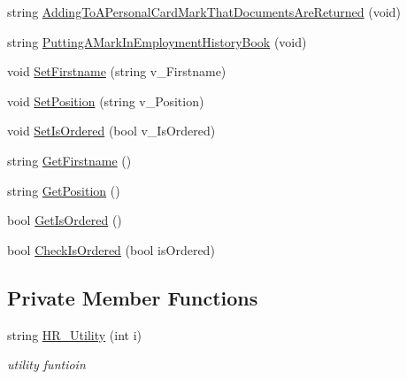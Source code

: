 \begin{DoxyCompactItemize}
string \hyperlink{class_h_r_a896d89581c96f0dcedca7440d2798d15}{Adding\+To\+A\+Personal\+Card\+Mark\+That\+Documents\+Are\+Returned} (void)
\item 
string \hyperlink{class_h_r_aacf64628213ae72aa5ff5a1b44e829fa}{Putting\+A\+Mark\+In\+Employment\+History\+Book} (void)
\item 
void \hyperlink{class_h_r_a795d089594c22910ea58938faf131b67}{Set\+Firstname} (string v\+\_\+\+Firstname)
\item 
void \hyperlink{class_h_r_ae092262d1dc245604fdb37fbe5564362}{Set\+Position} (string v\+\_\+\+Position)
\item 
void \hyperlink{class_h_r_ac927323d22c1580b0b6d258e28294322}{Set\+Is\+Ordered} (bool v\+\_\+\+Is\+Ordered)
\item 
string \hyperlink{class_h_r_a03a185de9601109b13c6a34c381b7b6f}{Get\+Firstname} ()
\item 
string \hyperlink{class_h_r_aed5b4581248646ba06467442b080c262}{Get\+Position} ()
\item 
bool \hyperlink{class_h_r_acbee31efce04c45b16cd9f24c7e2359c}{Get\+Is\+Ordered} ()
\item 
bool \hyperlink{class_h_r_af2203b0b515794db46c12b02bc9b9bd2}{Check\+Is\+Ordered} (bool is\+Ordered)
\end{DoxyCompactItemize}
\subsection*{Private Member Functions}
\begin{DoxyCompactItemize}
\item 
string \hyperlink{class_h_r_a55cb339b18d5eac3fb3a7a9a260d5f98}{H\+R\+\_\+\+Utility} (int i)
\begin{DoxyCompactList}\small\item\em utility funtioin \end{DoxyCompactList}\end{DoxyCompactItemize}
